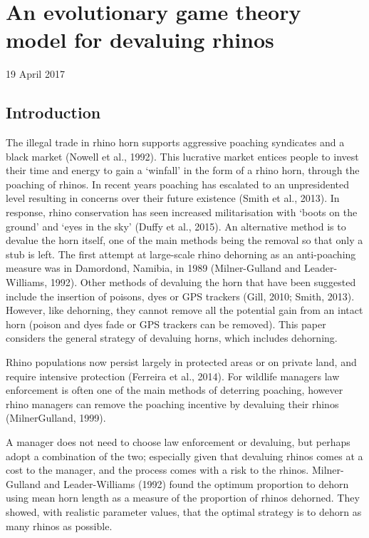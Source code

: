 \documentclass[10pt]{article}
\begin{document}
\listoftodos

\section{An evolutionary game theory model for devaluing rhinos}
19 April 2017

\subsection{Introduction}
The illegal trade in rhino horn supports aggressive poaching
syndicates and a black market (Nowell et al., 1992). This lucrative market entices people to invest their time and energy to gain a `winfall' in the form of a rhino horn, through the poaching of rhinos. In recent years poaching has escalated to an unpresidented level resulting in concerns over their future existence (Smith et al., 2013). In response, rhino conservation has seen increased militarisation with `boots on the ground' and `eyes in the sky' (Duffy et al., 2015). An alternative method is to devalue the horn itself, one of the main methods being the removal so that only a stub is left. The first attempt at large-scale rhino dehorning as an anti-poaching measure was in Damordond, Namibia, in 1989 (Milner-Gulland and Leader-Williams, 1992). Other methods of devaluing the horn that have been suggested include the insertion of poisons, dyes or GPS trackers (Gill, 2010; Smith, 2013). However, like dehorning, they cannot remove all the potential gain from an intact horn (poison and dyes fade or GPS trackers can be removed). This paper considers the general strategy of devaluing horns, which includes dehorning.

Rhino populations now persist largely in protected areas or
on private land, and require intensive protection (Ferreira et al., 2014). For wildlife managers law enforcement is often one of the main methods of deterring poaching, however rhino managers can remove the poaching incentive by devaluing their rhinos (MilnerGulland, 1999).

A manager does not need to choose law enforcement or devaluing, but perhaps adopt a combination of the two; especially given that devaluing rhinos comes at a cost to the manager, and the process comes with a risk to the rhinos. Milner-Gulland and Leader-Williams (1992) found the optimum proportion to dehorn using mean horn length as a measure of the proportion of rhinos dehorned. They showed, with realistic parameter values, that the optimal strategy is to dehorn as many rhinos as possible.
\end{document}
